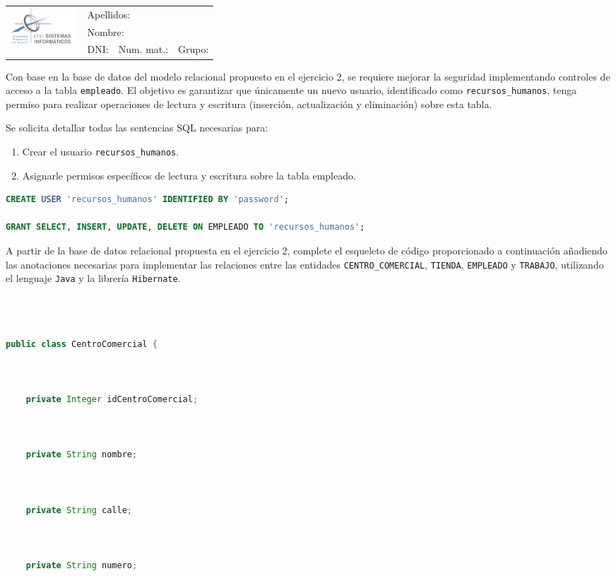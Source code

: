 \documentclass[12pt,a4paper,addpoints,answers]{exam}
\def\studentdata{
    \begin{table}[t]
        \renewcommand{\arraystretch}{1.2}
        \small
        \centering
        \begin{tabular}{|l|p{4cm}|p{4cm}|p{2.5cm}|}
            \hline
            \multirow{3}{*}{\includegraphics[width=2.5cm]{logos/etsisi.png}} & \multicolumn{3}{l|}{Apellidos:} \\ \cline{2-4} 
                                                                             & \multicolumn{3}{l|}{Nombre:}    \\ \cline{2-4} 
                                                                             & DNI:  & Num. mat.: & Grupo: \\ \hline
        \end{tabular}%
    \end{table}
}
\begin{document}
\begin{questions}
\newpage
\studentdata
\question[\half] Con base en la base de datos del modelo relacional propuesto en el ejercicio 2, se requiere mejorar la seguridad implementando controles de acceso a la tabla \texttt{empleado}. El objetivo es garantizar que únicamente un nuevo usuario, identificado como \texttt{recursos\_humanos}, tenga permiso para realizar operaciones de lectura y escritura (inserción, actualización y eliminación) sobre esta tabla.

Se solicita detallar todas las sentencias SQL necesarias para:
\begin{enumerate}
    \item Crear el usuario \texttt{recursos\_humanos}.
    \item Asignarle permisos específicos de lectura y escritura sobre la tabla empleado.
\end{enumerate}


\begin{solution}
\begin{lstlisting}[language=SQL]
CREATE USER 'recursos_humanos' IDENTIFIED BY 'password';

GRANT SELECT, INSERT, UPDATE, DELETE ON EMPLEADO TO 'recursos_humanos';

\end{lstlisting}       
\end{solution}

\newpage
\question[1] A partir de la base de datos relacional propuesta en el ejercicio 2, complete el esqueleto de código proporcionado a continuación añadiendo las anotaciones necesarias para implementar las relaciones entre las entidades \texttt{CENTRO\_COMERCIAL}, \texttt{TIENDA}, \texttt{EMPLEADO} y \texttt{TRABAJO}, utilizando el lenguaje \texttt{Java} y la librería \texttt{Hibernate}.

\begin{lstlisting}[language=Java]



public class CentroComercial {

    
    
    private Integer idCentroComercial;


    
    private String nombre;


    
    private String calle;


    
    private String numero;



\end{lstlisting}
\end{questions}
\end{document}
